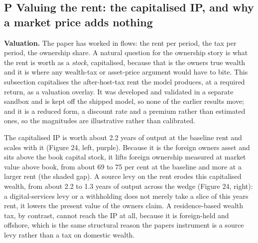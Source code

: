 \documentclass[11pt]{article}
\begin{document}
\hypertarget{p-valuing-the-rent-the-capitalised-ip-and-why-a-market-price-adds-nothing}{%
\subsection{P \textperiodcentered{} Valuing the rent: the capitalised IP, and why a market
price adds
nothing}\label{p-valuing-the-rent-the-capitalised-ip-and-why-a-market-price-adds-nothing}}

\textbf{Valuation.} The paper has worked in flows: the rent per period,
the tax per period, the ownership share. A natural question for the
ownership story is what the rent is worth as a \emph{stock},
capitalised, because that is the owner\textquotesingle s true wealth and
it is where any wealth-tax or asset-price argument would have to bite.
This subsection capitalises the after-host-tax rent the model produces,
at a required return, as a valuation overlay. It was developed and
validated in a separate sandbox and is kept off the shipped model, so
none of the earlier results move; and it is a reduced form, a discount
rate and a premium rather than estimated ones, so the magnitudes are
illustrative rather than calibrated.

The capitalised IP is worth about 2.2 years of output at the baseline
rent and scales with it (Figure 24, left, purple). Because it is the
foreign owner\textquotesingle s asset and sits above the book capital
stock, it lifts foreign ownership measured at market value above book,
from about 69 to 75 per cent at the baseline and more at a larger rent
(the shaded gap). A source levy on the rent erodes this capitalised
wealth, from about 2.2 to 1.3 years of output across the wedge (Figure
24, right): a digital-services levy or a withholding does not merely
take a slice of this year\textquotesingle s rent, it lowers the present
value of the owner\textquotesingle s claim. A residence-based wealth
tax, by contrast, cannot reach the IP at all, because it is foreign-held
and offshore, which is the same structural reason the
paper\textquotesingle s instrument is a source levy rather than a tax on
domestic wealth.
\end{document}
